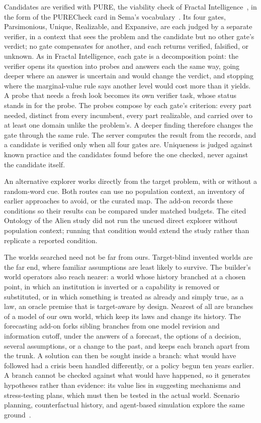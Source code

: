 \documentclass[11pt,a4paper]{article}
\begin{document}
Candidates are verified with PURE, the viability check of Fractal
Intelligence~\cite{westerbergFractal2026}, in the form of the PURECheck card in
Sema's vocabulary~\cite{westerbergSema2026}. Its four gates, Parsimonious, Unique,
Realizable, and Expansive, are each judged by a separate verifier, in a context
that sees the problem and the candidate but no other gate's verdict; no gate
compensates for another, and each returns verified, falsified, or unknown. As in
Fractal Intelligence, each gate is a decomposition point: the verifier opens its
question into probes and answers each the same way, going deeper where an answer
is uncertain and would change the verdict, and stopping where the marginal-value
rule says another level would cost more than it yields. A probe that needs a fresh
look becomes its own verifier task, whose status stands in for the probe. The
probes compose by each gate's criterion: every part needed, distinct from every
incumbent, every part realizable, and carried over to at least one domain unlike
the problem's. A deeper finding therefore changes the gate through the same rule.
The server computes the result from the records, and a candidate is verified only
when all four gates are. Uniqueness is judged against known practice and the
candidates found before the one checked, never against the candidate itself.

An alternative explorer works directly from the target problem, with or without
a random-word cue. Both routes can use no population context, an inventory of
earlier approaches to avoid, or the curated map. The add-on records these
conditions so their results can be compared under matched budgets. The cited
Ontology of the Alien study did not run the uncued direct explorer without
population context; running that condition would extend the study rather than
replicate a reported condition.

The worlds searched need not be far from ours. Target-blind invented worlds are
the far end, where familiar assumptions are least likely to survive. The
builder's world operators also reach nearer: a world whose history branched at
a chosen point, in which an institution is inverted or a capability is removed
or substituted, or in which something is treated as already and simply true, as
a law, an oracle premise that is target-aware by design. Nearest of all are
branches of a model of our own world, which keep its laws and change its
history. The forecasting add-on forks sibling branches from one model revision
and information cutoff, under the answers of a forecast, the options of a
decision, several assumptions, or a change to the past, and keeps each branch
apart from the trunk. A solution can then be sought inside a branch: what would
have followed had a crisis been handled differently, or a policy begun ten
years earlier. A branch cannot be checked against what would have happened, so
it generates hypotheses rather than evidence: its value lies in suggesting
mechanisms and stress-testing plans, which must then be tested in the actual
world. Scenario planning, counterfactual history, and agent-based simulation
explore the same
ground~\cite{wack1985scenarios,tetlockBelkin1996counterfactual,epsteinAxtell1996growing}.
\end{document}
